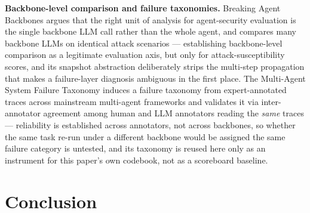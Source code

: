 \documentclass[11pt]{article}
\begin{document}
\textbf{Backbone-level comparison and failure taxonomies.} Breaking Agent Backbones \citep{BreakingBackbones2025} argues that the right unit of analysis for agent-security evaluation is the single backbone LLM call rather than the whole agent, and compares many backbone LLMs on identical attack scenarios --- establishing backbone-level comparison as a legitimate evaluation axis, but only for attack-susceptibility scores, and its snapshot abstraction deliberately strips the multi-step propagation that makes a failure-layer diagnosis ambiguous in the first place. The Multi-Agent System Failure Taxonomy \citep{MAST2503} induces a failure taxonomy from expert-annotated traces across mainstream multi-agent frameworks and validates it via inter-annotator agreement among human and LLM annotators reading the \emph{same} traces --- reliability is established across annotators, not across backbones, so whether the same task re-run under a different backbone would be assigned the same failure category is untested, and its taxonomy is reused here only as an instrument for this paper's own codebook, not as a scoreboard baseline.

\section{Conclusion}
\end{document}
